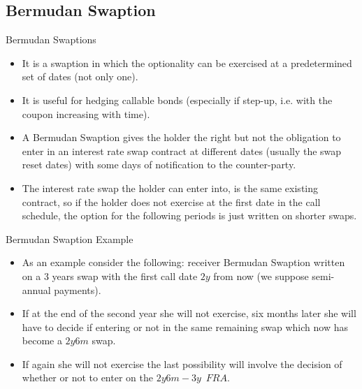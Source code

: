\documentclass{beamer}
\begin{document}
\subsection{Bermudan Swaption}
\begin{frame}{Bermudan Swaptions}
	\begin{itemize}
		\item<1-> It is a swaption in which the optionality can be exercised at a \textcolor{maincolor}{predetermined set of dates} (not only one).
		\item<2-> It is useful for hedging callable bonds (especially if step-up, i.e. with the coupon increasing with time).
		\item<3-> A \textcolor{maincolor}{Bermudan Swaption} gives the holder the right but not the obligation to enter in an interest rate swap contract at different dates (usually the swap reset dates) with some days of notification to the counter-party.
		\item<4-> The interest rate swap the holder can enter into, is the same existing contract, so if the holder does not exercise at the first date in the call schedule, the option for the following periods is just written on shorter swaps.
	\end{itemize}
\end{frame}

\begin{frame}{Bermudan Swaption Example}
	\begin{itemize}
		\item<1-> As an example consider the following: receiver Bermudan Swaption written on a 3 years swap with the first call date $2y$ from now (we suppose semi-annual payments).
		\item<2-> If at the end of the second year she will not exercise, six months later she will have to decide if entering or not in the same remaining swap which now has become a $2y6m$ swap.
		\item<3-> If again she will not exercise the last possibility will involve the decision of whether or not to enter on the $2y6m-3y$~$FRA$.
	\end{itemize}
\end{frame}
\end{document}
